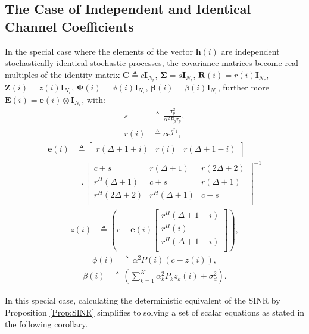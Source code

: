 \documentclass[conference, a4paper, 10pt]{IEEEtran}
\newcommand{\mx}[1]{\mathbf{#1}}
\newcommand{\bs}[1]{\boldsymbol{#1}}
\begin{document}
\subsection{The Case of Independent and Identical Channel Coefficients}
\label{Sec:IID}

In the special case where the elements of the vector $\mx{h}(i)$ are independent stochastically identical stochastic processes, the covariance matrices become real multiples of the identity matrix
$\mx{C} \triangleq c \mx{I}_{N_r}$, $\bs{\Sigma} = s \mx{I}_{N_r}$, $\mx{R}(i) = r(i) \mx{I}_{N_r}$, $\mx{Z}(i)= z(i) \mx{I}_{N_r}$, $\bs{\Phi}(i) = \phi(i)\mx{I}_{N_r}$,
$\bs{\beta}(i) = \beta(i) \mx{I}_{N_r}$,
further more $\mx{E}(i) = \mx{e}(i) \otimes \mx{I}_{N_r}$,
with:
\begin{align}
s &\triangleq \frac{\sigma_p^2}{\alpha^2P_p \tau_p},\\
\label{eq:Rdiag}
r(i) &\triangleq ce^{q^* i},
\end{align}
%
\begin{align}
\label{eq:Ediag}
 \mx{e}(i) &\triangleq
\begin{bmatrix}r(\Delta+1+i)&r(i)&r(\Delta+1-i)\end{bmatrix}
\nonumber\\
&~~\cdot\begin{bmatrix}
c+s & r(\Delta+1) &r(2\Delta+2) \\
r^H(\Delta+1) &c+s &r(\Delta+1) \\
r^H(2\Delta+2) & r^H(\Delta+1) & c+s\\
\end{bmatrix}^{-1}
\end{align}
%
\begin{align}
\label{eq:Zdiag}
 z(i) &\triangleq
\left(c - \mx{e}(i)  \begin{bmatrix}
r^H(\Delta+1+i) \\
r^H(i) \\
r^H(\Delta+1-i) \\
\end{bmatrix}
\right),
\end{align}
%
\begin{align}
\label{eq:Phidiag}
 \phi(i)  &\triangleq \alpha^2P(i)(c-z(i)),
\end{align}
%
\begin{align}
\label{eq:Betadiag}
\beta(i) &\triangleq  \left(\sum_{k=1}^K \alpha_k^2 P_k  z_k(i) + \sigma^2_d\right).
\end{align}

In this special case, calculating the deterministic equivalent of the \ac{SINR} by Proposition \ref{Prop:SINR} simplifies to solving a set of scalar equations as stated in the following corollary.
\end{document}
